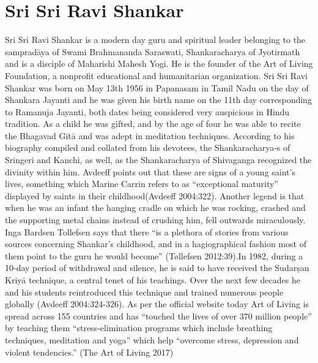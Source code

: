 \section*{Sri Sri Ravi Shankar}

Sri Sri Ravi Shankar is a modern day guru and spiritual leader belonging to the sampradāya of Swami Brahmananda Saraswati, Shankaracharya of Jyotirmath and is a disciple of Maharishi Mahesh Yogi. He is the founder of the Art of Living Foundation, a nonprofit educational and humanitarian organization. Sri Sri Ravi Shankar was born on May 13th 1956 in Papanasam in Tamil Nadu on the day of Shankara Jayanti and he was given his birth name on the 11th day corresponding to Ramanuja Jayanti, both dates being considered very auspicious in Hindu tradition. As a child he was gifted, and by the age of four he was able to recite the Bhagavad Gītā and was adept in meditation techniques. According to his biography compiled and collated from his devotees, the Shankaracharya-s of Sringeri and Kanchi, as well, as the Shankaracharya of Shivaganga recognized the divinity within him. Avdeeff points out that these are signs of a young saint’s lives, something which Marine Carrin refers to as “exceptional maturity” displayed by saints in their childhood(Avdeeff 2004:322). Another legend is that when he was an infant the hanging cradle on which he was rocking, crashed and the supporting metal chains instead of crushing him, fell outwards miraculously. Inga Bardsen Tollefsen says that there “is a plethora of stories from various sources concerning Shankar’s childhood, and in a hagiographical fashion most of them point to the guru he would become” (Tøllefsen 2012:39).In 1982, during a 10-day period of withdrawal and silence, he is said to have received the Sudarṣan Kriyā technique, a central tenet of his teachings. Over the next few decades he and his students reintroduced this technique and trained numerous people globally (Avdeeff 2004:324-326). As per the official website today Art of Living is spread across 155 countries and has “touched the lives of over 370 million people” by teaching them “stress-elimination programs which include breathing techniques, meditation and yoga” which help “overcome stress, depression and violent tendencies.” (The Art of Living 2017)

